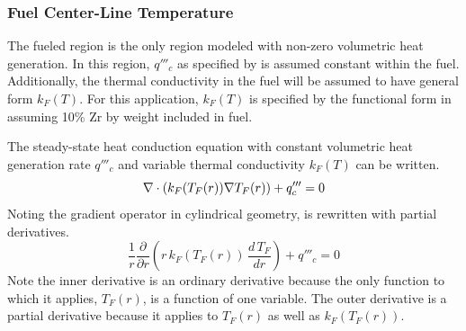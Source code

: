     \subsubsection{Fuel Center-Line Temperature}
      The fueled region is the only region modeled with non-zero volumetric heat
      generation. In this region, $q'''_c$ as specified by 
       is assumed constant within the fuel. 
      Additionally, the thermal conductivity in the fuel will be assumed to have
      general form $k_F(T)$. For this application, $k_F(T)$ is specified by the
      functional form in \cite{fuelProp} assuming 10\% Zr by weight included in
      fuel.

      The steady-state heat conduction equation with constant volumetric heat
      generation rate $q'''_c$ and variable thermal conductivity $k_F(T)$ can be
      written.
      \begin{equation}
        \label{eq:conduction_fuel}
        \mathbf{\nabla} \cdot (k_F(T_F(r)) \mathbf{\nabla} T_F(r)) + q'''_c = 0
      \end{equation}
      Noting the gradient operator in cylindrical geometry,
       is rewritten with partial derivatives.
      \begin{equation}
        \label{eq:conduction_fuel_cylindrical}
        \frac{1}{r} \frac{\partial}{\partial r} \left( r \, k_F(T_F(r)) \, 
          \frac{d \, T_F}{dr} \right) + q'''_c = 0
      \end{equation}
      Note the inner derivative is an ordinary derivative because the only
      function to which it applies, $T_F(r)$, is a function of one variable. The
      outer derivative is a partial derivative because it applies to $T_F(r)$ as
      well as $k_F(T_F(r))$.

